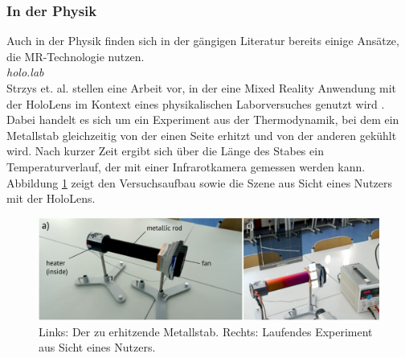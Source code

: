 \subsubsection{In der Physik}
Auch in der Physik finden sich in der gängigen Literatur bereits einige Ansätze, die MR-Technologie nutzen.\\

\vspace{4px}
\textit{holo.lab}\\
Strzys et. al. stellen eine Arbeit vor, in der eine Mixed Reality Anwendung mit der HoloLens im Kontext eines physikalischen Laborversuches genutzt wird \cite{Strzys17}. Dabei handelt es sich um ein Experiment aus der Thermodynamik, bei dem ein Metallstab gleichzeitig von der einen Seite erhitzt und von der anderen gekühlt wird. Nach kurzer Zeit ergibt sich über die Länge des Stabes ein Temperaturverlauf, der mit einer Infrarotkamera gemessen werden kann. Abbildung \ref{img:Strzys17} zeigt den Versuchsaufbau sowie die Szene aus Sicht eines Nutzers mit der HoloLens.\\

\begin{figure}[h!]
	\centering
	\includegraphics[width=1\textwidth]{images/Strzys18.png}
	\caption{Links: Der zu erhitzende Metallstab. Rechts: Laufendes Experiment aus Sicht eines Nutzers. \cite{Strzys17}}
	\label{img:Strzys17}
\end{figure}

